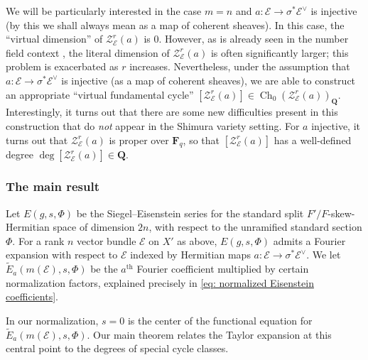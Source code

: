 \documentclass[reqno]{amsart}
\numberwithin{equation}{section}
\newcommand{\F}{\mathbf{F}}
\newcommand{\wt}[1]{\widetilde{#1}}
\newcommand{\Q}{\mathbf{Q}}
\newcommand{\Cal}[1]{\mathcal{#1}}
\newcommand{\co}{\colon}
\newcommand{\mrm}[1]{\mathrm{#1}}
\DeclareMathOperator{\Ch}{Ch}
\newcommand{\WZdel}[1]{{\color{yellow} Delete: {#1}}}
\newcommand\cE{\mathcal{E}}
\theoremstyle{remark}
\numberwithin{equation}{section}
\begin{document}
We will be particularly interested in the case $m=n$ and $a \co \cE \rightarrow \sigma^* \cE^{\vee}$ is injective (by this we shall always mean as a map of coherent sheaves). In this case, the ``virtual dimension'' of $\Cal{Z}_{\cE}^r(a)$ is $0$. However, as is already seen in the number field context \cite{KRII}, the literal dimension of $\Cal{Z}_{\cE}^r(a)$ is often significantly larger; this problem is exacerbated as $r$ increases. Nevertheless, under the assumption that $a \co \cE \rightarrow \sigma^* \cE^{\vee}$ is injective (as a map of coherent sheaves), we are able to construct an appropriate ``virtual fundamental cycle'' $[\Cal{Z}_{\cE}^r(a) ] \in \Ch_0(\Cal{Z}_{\cE}^r(a))_{\Q}$. Interestingly, it turns out that there are some new difficulties present in this construction that do \emph{not} appear in the Shimura variety setting. For $a$ injective, it turns out that $\Cal{Z}_{\cE}^r(a)$ is proper over $\F_{q}$, so that $[\Cal{Z}_{\cE}^r(a) ] $ has a well-defined degree $\deg[\Cal{Z}_{\cE}^r(a) ] \in \Q$. 



\subsubsection{The main result}
Let $E(g,s, \Phi)$ be the Siegel--Eisenstein series for the standard split $F'/F$-skew-Hermitian space of dimension $2n$, with respect to the unramified standard section $\Phi$. For a rank $n$ vector bundle $\cE$ on $X'$ as above, $E(g,s, \Phi)$ admits a Fourier expansion with respect to $\cE$ indexed by Hermitian maps $a \co \cE \rightarrow \sigma^* \cE^{\vee}$. We let $ \wt{E}_{a}(m(\cE),s,\Phi)$ be the $a^{\mrm{th}}$ Fourier coefficient multiplied by certain normalization factors, explained precisely in \eqref{eq: normalized Eisenstein coefficients}. 



In our normalization, $s=0$ is the center of the functional equation for $\wt{E}_a(m(\cE), s, \Phi)$. Our main theorem relates the Taylor expansion at this central point to the degrees of special cycle classes. 
\end{document}
